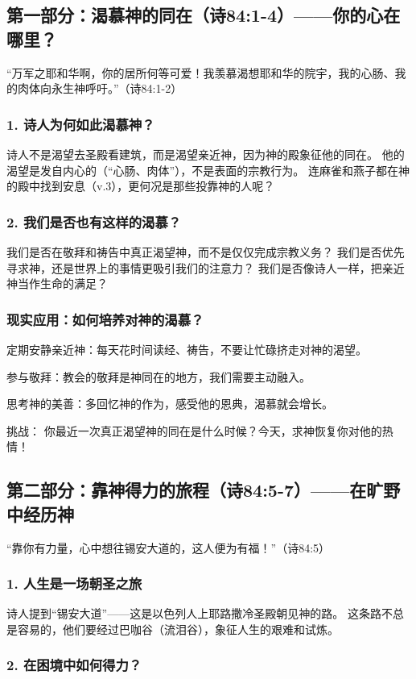 \documentclass[a4paper, 12pt]{article}
\begin{document}
\subsection*{第一部分：渴慕神的同在（诗84:1-4）——你的心在哪里？}
“万军之耶和华啊，你的居所何等可爱！我羡慕渴想耶和华的院宇，我的心肠、我的肉体向永生神呼吁。”（诗84:1-2）
\subsubsection*{1. 诗人为何如此渴慕神？}
诗人不是渴望去圣殿看建筑，而是渴望亲近神，因为神的殿象征他的同在。
他的渴望是发自内心的（“心肠、肉体”），不是表面的宗教行为。
连麻雀和燕子都在神的殿中找到安息（v.3），更何况是那些投靠神的人呢？
\subsubsection*{2. 我们是否也有这样的渴慕？}
我们是否在敬拜和祷告中真正渴望神，而不是仅仅完成宗教义务？
我们是否优先寻求神，还是世界上的事情更吸引我们的注意力？
我们是否像诗人一样，把亲近神当作生命的满足？
\subsubsection*{现实应用：如何培养对神的渴慕？}

\hspace{0.6cm}定期安静亲近神：每天花时间读经、祷告，不要让忙碌挤走对神的渴望。

参与敬拜：教会的敬拜是神同在的地方，我们需要主动融入。

思考神的美善：多回忆神的作为，感受他的恩典，渴慕就会增长。

挑战： 你最近一次真正渴望神的同在是什么时候？今天，求神恢复你对他的热情！
\subsection*{第二部分：靠神得力的旅程（诗84:5-7）——在旷野中经历神}
“靠你有力量，心中想往锡安大道的，这人便为有福！”（诗84:5）
\subsubsection*{1. 人生是一场朝圣之旅}
诗人提到“锡安大道”——这是以色列人上耶路撒冷圣殿朝见神的路。
这条路不总是容易的，他们要经过巴咖谷（流泪谷），象征人生的艰难和试炼。
\subsubsection*{2. 在困境中如何得力？}
\end{document}
